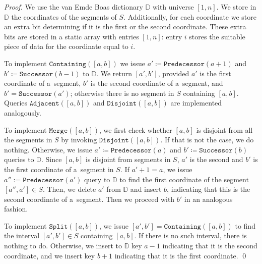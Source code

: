 \documentclass[runningheads]{llncs}
\begin{document}
\begin{proof}
We use the van Emde Boas dictionary $\mathbb{D}$ with universe $[1,n]$. We store in $\mathbb{D}$
the coordinates of the segments of $S$. Additionally, for each coordinate we store an extra bit determining if it is the first or the
second coordinate. These extra bits are stored in a static array with entries $[1,n]$: entry $i$ stores the suitable piece of data for the coordinate equal to $i$.

To implement $\mathtt{Containing}([a,b])$ we issue
$a'\coloneqq \mathtt{Predecessor}(a+1)$ and
$b'\coloneqq \mathtt{Successor}(b-1)$ to $\mathbb{D}$. We
return $[a',b']$, provided $a'$ is the first coordinate of a~segment, $b'$ is the second coordinate of a~segment, and $b'=\mathtt{Successor}(a')$; otherwise there is no segment in $S$ containing $[a,b]$. Queries $\mathtt{Adjacent}([a,b])$ and $\mathtt{Disjoint}([a,b])$ are implemented
analogously.

To implement $\mathtt{Merge}([a,b])$, we first check whether $[a,b]$ is disjoint from all the segments in $S$ by invoking $\mathtt{Disjoint}([a,b])$. 
If that is not the case, we do nothing.
Otherwise, we issue
$a'\coloneqq\mathtt{Predecessor}(a)$ and
$b'\coloneqq\mathtt{Successor}(b)$ queries to $\mathbb{D}$.
Since $[a,b]$ is disjoint from segments in $S$, $a'$ is the second
and $b'$ is the first coordinate of a~segment in $S$. If $a'+1=a$,
we issue $a'':=\mathtt{Predecessor}(a')$ query to
$\mathbb{D}$ to find the first coordinate of the segment
$[a'',a'] \in S$. Then, we delete $a'$ from $\mathbb{D}$ and
insert $b$, indicating that this is the second coordinate of a~segment. 
Then we
proceed with $b'$ in an analogous fashion.

To implement $\mathtt{Split}([a,b])$, we issue
$[a',b']=\mathtt{Containing}([a,b])$ to find
the interval
$[a',b']\in S$ containing $[a,b]$. If there is no such interval, there is nothing to do.
Otherwise, we insert to
$\mathbb{D}$ key $a-1$ indicating that it is the second coordinate,
and we insert key $b+1$ indicating that it is the first coordinate.
\qed



\end{proof}
\end{document}
